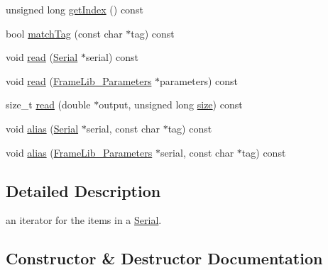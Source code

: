 \begin{DoxyCompactItemize}
\item 
unsigned long \hyperlink{class_frame_lib___parameters_1_1_serial_1_1_iterator_a4830c0c6fc8b43477e5d06cde65cd396}{get\+Index} () const
\item 
bool \hyperlink{class_frame_lib___parameters_1_1_serial_1_1_iterator_ac0d7b5a5158bc9d9652539bb0775c23c}{match\+Tag} (const char $\ast$tag) const
\item 
void \hyperlink{class_frame_lib___parameters_1_1_serial_1_1_iterator_ac64287fc7627c49d5f6b592181fb914a}{read} (\hyperlink{class_frame_lib___parameters_1_1_serial}{Serial} $\ast$serial) const
\item 
void \hyperlink{class_frame_lib___parameters_1_1_serial_1_1_iterator_afccdc2c5875c7dcbbedde988991e137f}{read} (\hyperlink{class_frame_lib___parameters}{Frame\+Lib\+\_\+\+Parameters} $\ast$parameters) const
\item 
size\+\_\+t \hyperlink{class_frame_lib___parameters_1_1_serial_1_1_iterator_adda0cb1e1555363505f462eca7a3b9b1}{read} (double $\ast$output, unsigned long \hyperlink{class_frame_lib___parameters_1_1_serial_a04ad46904d9fd8119283eae663901886}{size}) const
\item 
void \hyperlink{class_frame_lib___parameters_1_1_serial_1_1_iterator_ab67005473b98c2a4eb2f264da87232d2}{alias} (\hyperlink{class_frame_lib___parameters_1_1_serial}{Serial} $\ast$serial, const char $\ast$tag) const
\item 
void \hyperlink{class_frame_lib___parameters_1_1_serial_1_1_iterator_a3852e9a8709c38d4d5fd608f54cfab28}{alias} (\hyperlink{class_frame_lib___parameters}{Frame\+Lib\+\_\+\+Parameters} $\ast$serial, const char $\ast$tag) const
\end{DoxyCompactItemize}


\subsection{Detailed Description}
an iterator for the items in a \hyperlink{class_frame_lib___parameters_1_1_serial}{Serial}. 

\subsection{Constructor \& Destructor Documentation}
\mbox{\label{class_frame_lib___parameters_1_1_serial_1_1_iterator_aae8229457c25d32215f4b185712e3a57}} 
